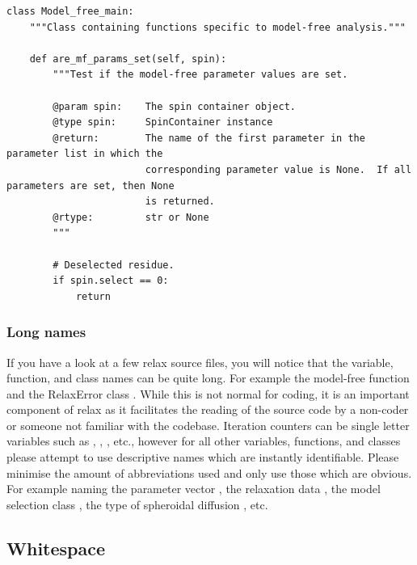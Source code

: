 \begin{footnotesize}
\begin{verbatim}
class Model_free_main:
    """Class containing functions specific to model-free analysis."""

    def are_mf_params_set(self, spin):
        """Test if the model-free parameter values are set.

        @param spin:    The spin container object.
        @type spin:     SpinContainer instance
        @return:        The name of the first parameter in the parameter list in which the
                        corresponding parameter value is None.  If all parameters are set, then None
                        is returned.
        @rtype:         str or None
        """

        # Deselected residue.
        if spin.select == 0:
            return
\end{verbatim}
\end{footnotesize}



\subsubsection{Long names}

If you have a look at a few relax source files, you will notice that the variable, function, and class names can be quite long.  For example the model-free function  and the RelaxError class .  While this is not normal for coding, it is an important component of relax as it facilitates the reading of the source code by a non-coder or someone not familiar with the codebase.  Iteration counters can be single letter variables such as , , , etc., however for all other variables, functions, and classes please attempt to use descriptive names which are instantly identifiable.  Please minimise the amount of abbreviations used and only use those which are obvious.  For example naming the parameter vector , the relaxation data , the model selection class , the type of spheroidal diffusion , etc.



\subsection{Whitespace}

